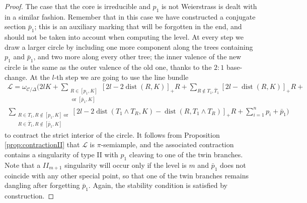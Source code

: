 \documentclass[11pt]{amsart}
\newcommand{\dvr}{\Delta}
\newcommand{\dist}{\operatorname{dist}}
\theoremstyle{plain}
\theoremstyle{definition}
\begin{document}
\begin{proof}
  The case that the core is irreducible and $p_1$ is not Weierstrass is dealt with in a similar fashion. Remember that in this case we have constructed a conjugate section $\bar p_1$; this is an auxiliary marking that will be forgotten in the end, and should not be taken into account when computing the level. At every step we draw a larger circle by including one more component along the trees containing $p_1$ and $\bar p_1$, and two more along every other tree; the inner valence of the new circle is the same as the outer valence of the old one, thanks to the $2:1$ base-change. At the $l$-th step we are going to use the line bundle
  \begin{multline*}
  \mathcal L=\omega_{\mathcal C/\dvr}(2l K + \sum_{\substack{R\in [p_1,K]\\ \text{ or }[\bar p_1,K]}}[2l-2\dist(R,K)]_+R +\sum_{R\notin T_1,\bar T_1}[2l-\dist(R,K)]_+R +\\
  \sum_{\substack{R\in T_1,R\notin [p_1,K]\text{ or} \\ R\in \bar T_1,R\notin [\bar p_1,K]}}[2l-2\dist(T_1\wedge T_R,K)-\dist(R,T_1\wedge T_R)]_+R+ \sum_{i=1}^np_i+\bar p_1)
  \end{multline*}
  to contract the strict interior of the circle. It follows from Proposition \ref{prop:contractionII} that $\mathcal L$ is $\pi$-semiample, and the associated contraction contains a singularity of type II with $p_1$ cleaving to one of the twin branches. Note that a $I\!I_{m+1}$ singularity will occur only if the level is $m$ and $\bar p_1$ does not coincide with any other special point, so that one of the twin branches remains dangling after forgetting $\bar p_1$. Again, the stability condition is satisfied by construction.
  
  \smallskip
  

\end{proof}
\end{document}
